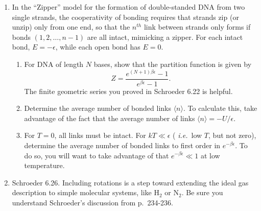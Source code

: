 \documentclass[12pt]{article}
\begin{document}
\begin{enumerate}
\item In the ``Zipper'' model for the formation of double-standed DNA
  from two single strands, the cooperativity of bonding requires that
  strands zip (or unzip) only from one end, so that the $n^{th}$ link
  between strands only forms if bonds $(1, 2, \dots, n-1)$ are all
  intact, mimicking a zipper.  For each intact bond, $E = -\epsilon$,
  while each open bond has $E=0$.
\begin{enumerate}
\item For DNA of length $N$ bases, show that the partition function is given by
$$ {Z} = \frac{e^{(N+1)\beta\epsilon}-1}{e^{\beta\epsilon}-1}. $$
The finite geometric series you proved in Schroeder 6.22 is helpful.
\item Determine the average number of bonded links $\langle n \rangle$.
  To calculate this, take advantage of the fact that the average number
  of links $\langle n \rangle = -U/\epsilon$.  
\item For $T=0$, all links must be intact.  For $kT \ll \epsilon$ ({\it
    i.e.}\ low $T$, but not zero), determine the average number of bonded
  links to first order in $e^{-\beta\epsilon}$.  To do so, you will want
  to take advantage of that $e^{-\beta\epsilon} \ll 1$ at low
  temperature.
\end{enumerate}

\item Schroeder 6.26.  Including rotations is a step toward extending
  the ideal gas description to simple molecular systems, like H$_2$ or
  N$_2$.  Be sure you understand Schroeder's discussion from p.\ 234-236.

\begin{comment}
\item To extend our treatment of the ideal gas to molecular systems, we
  need to account for the fact that molecules can rotate.  From quantum
  mechanics, we know that rotational energy levels are quantized
  according to
\[ \epsilon(j) = j(j+1)\epsilon \]
where $j=0,1,2,...$.  In addition, each rotational level has a multiplicity
\[g(j) = 2j+1. \]
\begin{enumerate}
\item Evaluate the partition function for the rotational motion.
  Remember that you must sum over all {\it states}, and that each energy
  level has multiplicity.
\item In the high-$T$ limit ($kT \gg \epsilon_{0}$), evaluate $Z$ by
  converting the sum to an integral.
\item In the low-$T$ limit ($kT \ll \epsilon_{0}$), evaluate $Z$ by
  truncating the sum after the first non-trivial term (one is trivial).
\item Evaluate the energy $U$ in both the high- and low-$T$ limits.
\item Sketch $U$ as a function of $T$.  Note that I really mean sketch,
  do not use a computer.  You will have only a low- and high-$T$
  expression, so you will have to connect the two in a reasonable way.
\end{enumerate}
\end{comment}


\end{enumerate}
\end{document}
